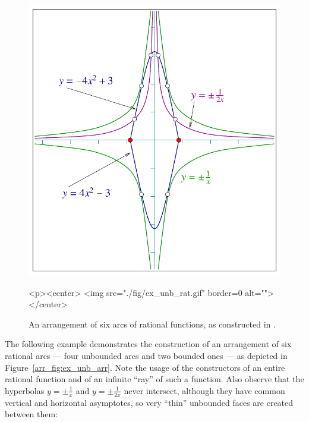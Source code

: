 
\begin{figure}[t]
\begin{ccTexOnly}
  \begin{center}
  \includegraphics{Arrangement_2/fig/ex_unb_rat}
  \end{center}
\end{ccTexOnly}
\begin{ccHtmlOnly}
  <p><center>
  <img src="./fig/ex_unb_rat.gif" border=0 alt="">
  </center>
\end{ccHtmlOnly}
\caption{An arrangement of six arcs of rational functions, as
constructed in
.\label{arr_fig:ex_unb_rat}}
\end{figure}

The following example demonstrates the construction of an
arrangement of six rational arcs --- four unbounded arcs and two
bounded ones --- as depicted in Figure~\ref{arr_fig:ex_unb_arr}. Note
the usage of the constructors of an entire rational function and of
an infinite ``ray'' of such a function. Also observe that the hyperbolas
$y = \pm\frac{1}{x}$ and $y = \pm\frac{1}{2x}$ never intersect, although
they have common vertical and horizontal asymptotes, so very ``thin''
unbounded faces are created between them:

